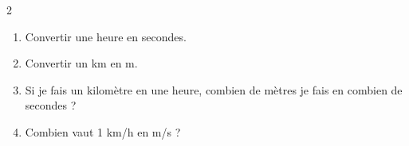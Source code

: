 \documentclass[11pt,a5paper,landscape]{article}
\begin{document}
\begin{multicols*}{2}

\begin{enumerate}
    \item Convertir une heure en secondes.
    \item Convertir un km en m.
    \item Si je fais un kilomètre en une heure, combien de mètres je fais en combien de secondes ?
    \item Combien vaut 1 km/h en m/s ?
\end{enumerate}

\end{multicols*}
\end{document}
